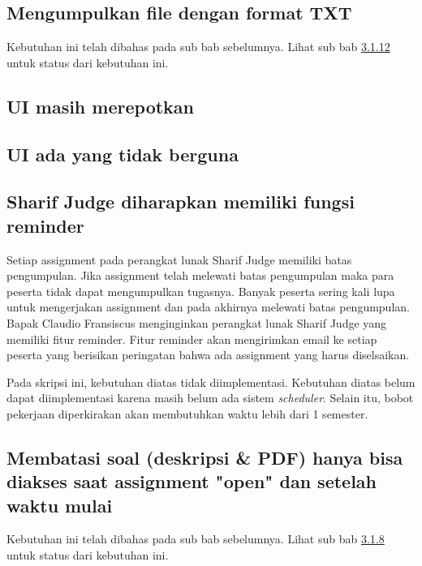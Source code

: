 \subsection{Mengumpulkan file dengan format TXT}
Kebutuhan ini telah dibahas pada sub bab sebelumnya. Lihat sub bab \hyperref[subsec:filetxt]{3.1.12} untuk status dari kebutuhan ini.

\subsection{UI masih merepotkan}

\subsection{UI ada yang tidak berguna}

\subsection{Sharif Judge diharapkan memiliki fungsi reminder}
Setiap assignment pada perangkat lunak Sharif Judge memiliki batas pengumpulan. Jika assignment telah melewati batas pengumpulan maka para peserta tidak dapat mengumpulkan tugasnya. Banyak peserta sering kali lupa untuk mengerjakan assignment dan pada akhirnya melewati batas pengumpulan. Bapak Claudio Fransiscus menginginkan perangkat lunak Sharif Judge yang memiliki fitur reminder. Fitur reminder akan mengirimkan email ke setiap peserta yang berisikan peringatan bahwa ada assignment yang harus diselsaikan. 

Pada skripsi ini, kebutuhan diatas tidak diimplementasi. Kebutuhan diatas belum dapat diimplementasi karena masih belum ada sistem \textit{scheduler}. Selain itu, bobot pekerjaan diperkirakan akan membutuhkan waktu lebih dari 1 semester.

\subsection{Membatasi soal (deskripsi \& PDF) hanya bisa diakses saat assignment "open" dan setelah waktu mulai}
Kebutuhan ini telah dibahas pada sub bab sebelumnya. Lihat sub bab \hyperref[subsec:membatasisoal]{3.1.8} untuk status dari kebutuhan ini.

